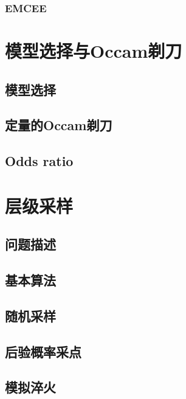 \subsubsection{EMCEE}

\section{模型选择与Occam剃刀}
\subsection{模型选择}
\subsection{定量的Occam剃刀}
\subsection{Odds ratio}

\section{层级采样}
\subsection{问题描述}
\subsection{基本算法}
\subsection{随机采样} 
\subsection{后验概率采点}
\subsection{模拟淬火}
